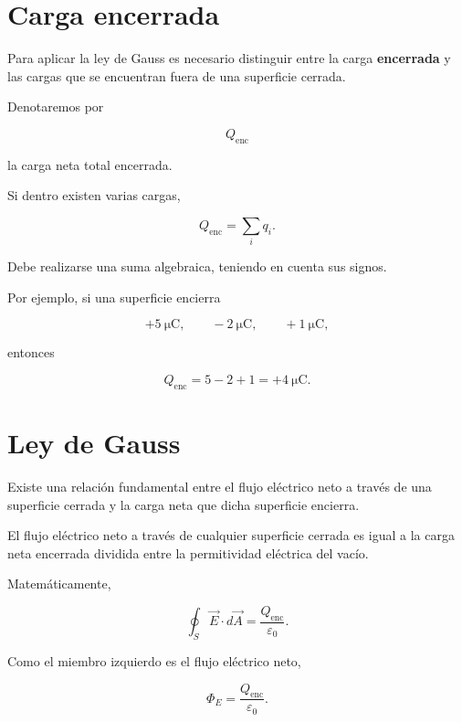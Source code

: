 \section{Carga encerrada}

Para aplicar la ley de Gauss es necesario distinguir entre la carga
\textbf{encerrada} y las cargas que se encuentran fuera de una superficie cerrada.

Denotaremos por

\[
Q_{\text{enc}}
\]

la carga neta total encerrada.

Si dentro existen varias cargas,

\[
\boxed{Q_{\text{enc}}=\sum_iq_i}.
\]

Debe realizarse una suma algebraica, teniendo en cuenta sus signos.

Por ejemplo, si una superficie encierra

\[
+\SI{5}{\micro\coulomb},
\qquad
-\SI{2}{\micro\coulomb},
\qquad
+\SI{1}{\micro\coulomb},
\]

entonces

\[
Q_{\text{enc}}
=
5-2+1
=
+\SI{4}{\micro\coulomb}.
\]


\section{Ley de Gauss}

Existe una relación fundamental entre el flujo eléctrico neto a través de una superficie
cerrada y la carga neta que dicha superficie encierra.

\begin{principio}

El flujo eléctrico neto a través de cualquier superficie cerrada es igual a la carga neta
encerrada dividida entre la permitividad eléctrica del vacío.

\end{principio}

Matemáticamente,

\begin{equation}
\boxed{
\oint_S\vec E\cdot d\vec A
=
\frac{Q_{\text{enc}}}{\varepsilon_0}
}.
\label{eq:ley_gauss}
\end{equation}

Como el miembro izquierdo es el flujo eléctrico neto,

\begin{equation}
\boxed{
\Phi_E=\frac{Q_{\text{enc}}}{\varepsilon_0}
}.
\label{eq:gauss_flujo}
\end{equation}

